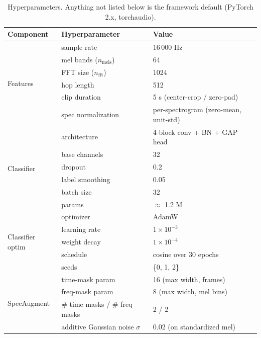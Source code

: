\documentclass[final]{article}
\begin{document}
\begin{table}[!ht]
\centering
\footnotesize
\renewcommand{\arraystretch}{0.95}
\caption{Hyperparameters. Anything not listed below is the framework default (PyTorch 2.x, torchaudio).}\label{tab:hyperparams}
\begin{tabular}{lll}
\toprule
Component & Hyperparameter & Value \\
\midrule
\multirow{6}{*}{Features} & sample rate & 16\,000 Hz \\
                          & mel bands ($n_{\text{mels}}$) & 64 \\
                          & FFT size ($n_{\text{fft}}$) & 1024 \\
                          & hop length & 512 \\
                          & clip duration & 5 s (center-crop / zero-pad) \\
                          & spec normalization & per-spectrogram (zero-mean, unit-std) \\
\midrule
\multirow{6}{*}{Classifier} & architecture & 4-block conv + BN + GAP head \\
                            & base channels & 32 \\
                            & dropout & 0.2 \\
                            & label smoothing & 0.05 \\
                            & batch size & 32 \\
                            & params & $\approx$ 1.2 M \\
\midrule
\multirow{5}{*}{Classifier optim} & optimizer & AdamW \\
                          & learning rate & $1\times10^{-3}$ \\
                          & weight decay & $1\times10^{-4}$ \\
                          & schedule & cosine over 30 epochs \\
                          & seeds & \{0, 1, 2\} \\
\midrule
\multirow{6}{*}{SpecAugment} & time-mask param & 16 (max width, frames) \\
                             & freq-mask param & 8 (max width, mel bins) \\
                             & \# time masks / \# freq masks & 2 / 2 \\
                             & additive Gaussian noise $\sigma$ & 0.02 (on standardized mel) \\

\end{tabular}
\end{table}
\end{document}
